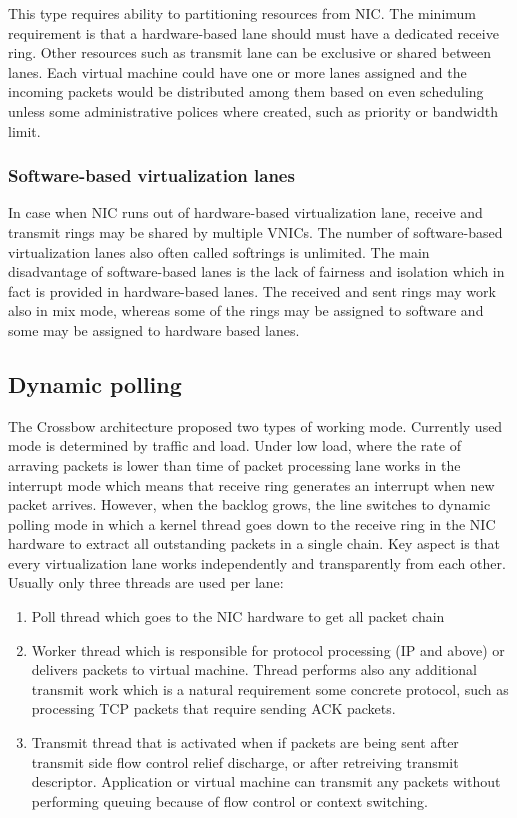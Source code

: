 \documentclass[11pt]{book}
\begin{document}
			This type requires ability to partitioning resources from NIC. The minimum requirement is that a hardware-based lane should must have a dedicated receive ring.
			Other resources such as transmit lane can be exclusive or shared between lanes. Each virtual machine could have one or more lanes assigned and the incoming packets
			would be distributed among them based on even scheduling unless some administrative polices where created, such as priority or bandwidth limit.		
			
			\subsubsection{Software-based virtualization lanes}
			
			In case when NIC runs out of hardware-based virtualization lane, receive and transmit rings may be shared by multiple VNICs. The number of software-based virtualization 
			lanes also often called softrings is unlimited. The main disadvantage of software-based lanes is the lack of fairness and isolation which in fact is provided in hardware-based
			lanes. The received and sent rings may work also in mix mode, whereas some of the rings may be assigned to software and some may be assigned to hardware based lanes.	
			
		\subsection{Dynamic polling}	
			
			The Crossbow architecture proposed two types of working mode. Currently used mode is determined by traffic and load. Under low load, where the rate of arraving packets is lower than
			time of packet processing lane works in the interrupt mode which means that receive ring generates an interrupt when new packet arrives. However, when the backlog grows, the line 
			switches to dynamic polling mode in which a kernel thread goes down to the receive ring in the NIC hardware to extract all outstanding packets in a single chain. Key aspect is that 
			every virtualization lane works independently and transparently from each other. Usually only three threads are used per lane:
			
			\begin{enumerate}
				\item{Poll thread which goes to the NIC hardware to get all packet chain}
				\item{Worker thread which is responsible for protocol processing (IP and above) or delivers packets to virtual machine. Thread performs also any additional transmit work which is a natural 
				requirement some concrete protocol, such as processing TCP packets that require sending ACK packets.}
				\item{Transmit thread that is activated when if packets are being sent after transmit side flow control relief discharge, or after retreiving transmit descriptor. Application or virtual 
				machine can transmit any packets without performing queuing because of flow control or context switching.}
			\end{enumerate}
\end{document}
